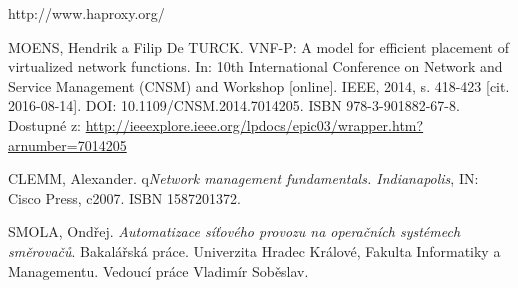 \begin{thebibliography}{10}

 http://www.haproxy.org/


MOENS, Hendrik a Filip De TURCK. VNF-P: A model for efficient placement of virtualized network functions. In: 10th International Conference on Network and Service Management (CNSM) and Workshop [online]. IEEE, 2014, s. 418-423 [cit. 2016-08-14]. DOI: 10.1109/CNSM.2014.7014205. ISBN 978-3-901882-67-8. Dostupné z: \url{http://ieeexplore.ieee.org/lpdocs/epic03/wrapper.htm?arnumber=7014205}

 CLEMM, Alexander. q\emph{Network management fundamentals. Indianapolis}, IN: Cisco Press, c2007. ISBN 1587201372.

 SMOLA, Ondřej. \emph{Automatizace síťového provozu na operačních systémech směrovačů}. Bakalářská práce. Univerzita Hradec Králové, Fakulta Informatiky a Managementu. Vedoucí práce Vladimír Soběslav. 


\end{thebibliography}